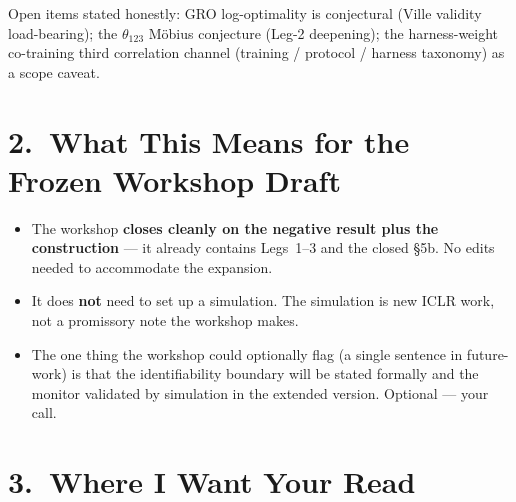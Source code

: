 \documentclass[11pt,a4paper]{article}
\begin{document}
Open items stated honestly: GRO log-optimality is conjectural (Ville validity load-bearing); the $\theta_{123}$ M\"{o}bius conjecture (Leg-2 deepening); the harness-weight co-training third correlation channel (training / protocol / harness taxonomy) as a scope caveat.

\bigskip

\section*{2.\ What This Means for the Frozen Workshop Draft}

\begin{itemize}
  \item The workshop \textbf{closes cleanly on the negative result plus the construction} --- it already contains Legs~1--3 and the closed \S5b. No edits needed to accommodate the expansion.
  \item It does \textbf{not} need to set up a simulation. The simulation is new ICLR work, not a promissory note the workshop makes.
  \item The one thing the workshop could optionally flag (a single sentence in future-work) is that the identifiability boundary will be stated formally and the monitor validated by simulation in the extended version. Optional --- your call.
\end{itemize}

\bigskip

\section*{3.\ Where I Want Your Read}
\end{document}
